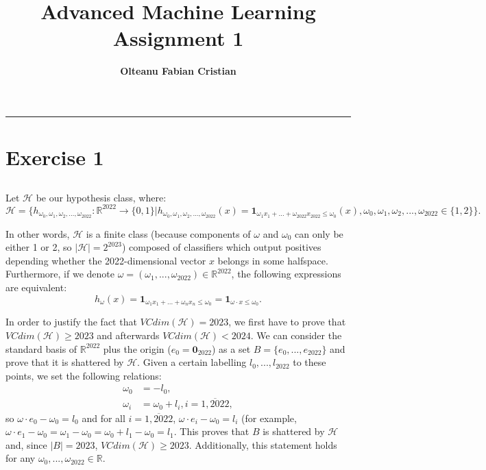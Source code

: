 \documentclass{article}
\author{\textbf{Olteanu Fabian Cristian}}
\affil{FMI, AI Master, Year 1
}
\title{\textbf{\huge Advanced Machine Learning Assignment 1}}
\date{}
\begin{document}
\pagestyle{headings}	
\newpage
\setcounter{page}{1}
\renewcommand{\thepage}{\arabic{page}}


	
	
\setlength{\parskip}{0.5em}
	
\maketitle
	
\noindent\rule{15cm}{0.4pt}
\renewcommand{\thesubsection}{\thesection.\alph{subsection}}

\section{Exercise 1}
\subsection{}
Let $\mathcal{H}$ be our hypothesis class, where:
$
\mathcal{H}=\{h_{\omega_0, \omega_1,\omega_2,...,\omega_{2022}}:\mathbb{R}^{2022} \rightarrow \{0,1\}|h_{\omega_0, \omega_1,\omega_2,...,\omega_{2022}}(x) = \mathbf{1}_{\omega_1x_1 + ... + \omega_{2022}x_{2022} \leq \omega_0}(x), \omega_0,\omega_1,\omega_2,...,\omega_{2022}\in \{1,2\}\}.
$

In other words, $\mathcal{H}$ is a finite class (because components of $\omega$ and $\omega_0$ can only be either 1 or 2, so $|\mathcal{H}|=2^{2023}$) composed of classifiers which output positives depending whether the 2022-dimensional vector $x$ belongs in some halfspace. Furthermore, if we denote $\omega=(\omega_1,...,\omega_{2022})\in \mathbb{R}^{2022}$, the following expressions are equivalent: 
$$
h_\omega(x)=\mathbf{1}_{\omega_1x_1 + ... + \omega_nx_n \leq \omega_0}=\mathbf{1}_{\omega \cdot x \leq \omega_0}.$$

In order to justify the fact that $VCdim(\mathcal{H})=2023$, we first have to prove that $VCdim(\mathcal{H})\geq2023$ and afterwards $VCdim(\mathcal{H})<2024$. We can consider the standard basis of $\mathbb{R}^{2022}$ plus the origin ($e_0=\mathbf{0}_{2022}$) as a set $B=\{e_0,...,e_{2022}\}$ and prove that it is shattered by $\mathcal{H}$. Given a certain labelling $l_0,...,l_{2022}$ to these points, we set the following relations:
\begin{align*}
\omega_0 &= -l_0, \\
\omega_i &= \omega_0 + l_i, i=\overline{1,2022},
\end{align*}
so $\omega \cdot e_0 - \omega_0=l_0$ and for all $i=\overline{1,2022}$, $\omega \cdot e_i - \omega_0 = l_i$ (for example, $\omega \cdot e_1 - \omega_0 = \omega_1 - \omega_0 = \omega_0 + l_1 - \omega_0 = l_1$. This proves that $B$ is shattered by $\mathcal{H}$ and, since $|B|=2023$, $VCdim(\mathcal{H}) \geq 2023$. Additionally, this statement holds for any $\omega_0,...,\omega_{2022} \in \mathbb{R}$.
\end{document}
